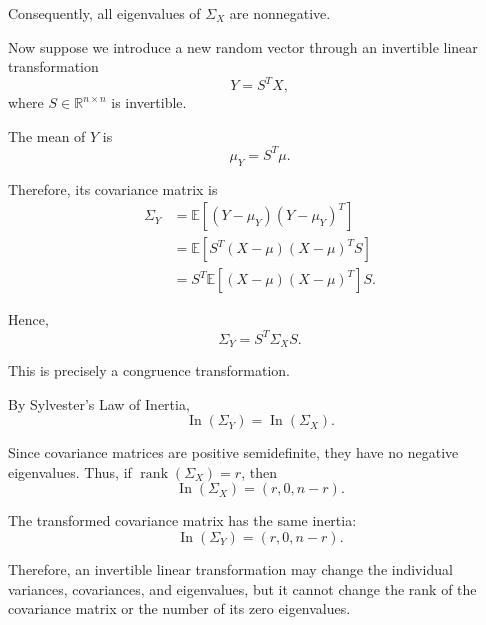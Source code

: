 \documentclass[11pt]{article}
\theoremstyle{definition}
\theoremstyle{remark}
\begin{document}
Consequently, all eigenvalues of $\Sigma_X$
are nonnegative.

Now suppose we introduce a new random vector
through an invertible linear transformation
\[
    Y=S^TX,
\]
where $S\in\mathbb{R}^{n\times n}$ is invertible.

The mean of $Y$ is
\[
    \mu_Y=S^T\mu.
\]

Therefore, its covariance matrix is
\[
\begin{aligned}
    \Sigma_Y
    &=\mathbb{E}\left[
      (Y-\mu_Y)(Y-\mu_Y)^T
      \right]\\
    &=\mathbb{E}\left[
      S^T(X-\mu)(X-\mu)^TS
      \right]\\
    &=S^T\mathbb{E}\left[
      (X-\mu)(X-\mu)^T
      \right]S.
\end{aligned}
\]

Hence,
\[
    \boxed{\Sigma_Y=S^T\Sigma_XS}.
\]

This is precisely a congruence transformation.

By Sylvester's Law of Inertia,
\[
    \boxed{
    \operatorname{In}(\Sigma_Y)
    =\operatorname{In}(\Sigma_X).
    }
\]

Since covariance matrices are positive
semidefinite, they have no negative eigenvalues.
Thus, if $\operatorname{rank}(\Sigma_X)=r$,
then
\[
    \operatorname{In}(\Sigma_X)=(r,0,n-r).
\]

The transformed covariance matrix has
the same inertia:
\[
    \operatorname{In}(\Sigma_Y)=(r,0,n-r).
\]

Therefore, an invertible linear transformation
may change the individual variances,
covariances, and eigenvalues, but it cannot
change the rank of the covariance matrix
or the number of its zero eigenvalues.
\end{document}
